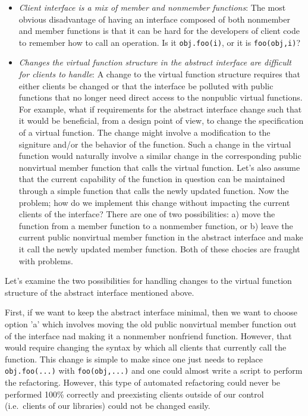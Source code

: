 \documentclass[pdf,ps2pdf,11pt]{SANDreport}
\begin{document}
\begin{itemize}

{}\item\textit{Client interface is a mix of member and nonmember functions}:
The most obvious disadvantage of having an interface composed of both
nonmember and member functions is that it can be hard for the developers of
client code to remember how to call an operation.  Is it
{}\texttt{obj.foo(i)}, or it is {}\texttt{foo(obj,i)}?

{}\item\textit{Changes the virtual function structure in the abstract
interface are difficult for clients to handle}: A change to the virtual
function structure requires that either clients be changed or that the
interface be polluted with public functions that no longer need direct access
to the nonpublic virtual functions.  For example, what if requirements for the
abstract interface change such that it would be beneficial, from a design
point of view, to change the specification of a virtual function.  The change
might involve a modification to the signiture and/or the behavior of the
function.  Such a change in the virtual function would naturally involve a
similar change in the corresponding public nonvirtual member function that
calls the virtual function.  Let's also assume that the current capability of
the function in question can be maintained through a simple function that
calls the newly updated function.  Now the problem; how do we implement this
change without impacting the current clients of the interface?  There are one
of two possibilities: a) move the function from a member function to a
nonmember function, or b) leave the current public nonvirtual member function
in the abstract interface and make it call the newly updated member function.
Both of these chocies are fraught with problems.

\end{itemize}

Let's examine the two possibilities for handling changes to the virtual
function structure of the abstract interface mentioned above.

First, if we want to keep the abstract interface minimal, then we want to
choose option 'a' which involves moving the old public nonvirtual member
function out of the interface nad making it a nonmember nonfriend function.
However, that would require changing the syntax by which all clients that
currently call the function.  This change is simple to make since one just
needs to replace {}\texttt{obj.foo(...)} with {}\texttt{foo(obj,...)} and one
could almost write a script to perform the refactoring.  However, this type of
automated refactoring could never be performed 100\% correctly and preexisting
clients outside of our control (i.e.\ clients of our libraries) could not be
changed easily.
\end{document}
